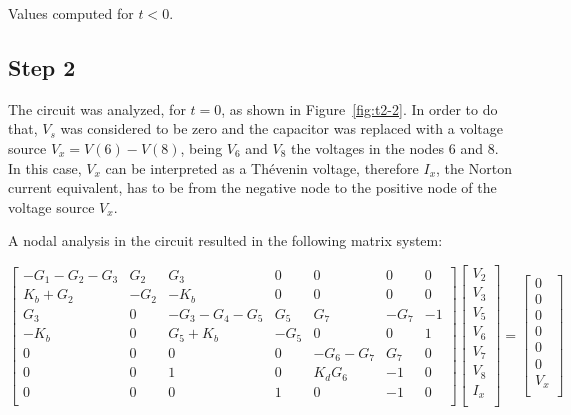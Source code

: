 \begin{table}[ht!]
  \centering
    
  \caption{Values computed for $t<0$.}
  \label{tab:teo1}
\end{table}




\subsection{Step 2}
The circuit was analyzed, for $t=0$, as shown in Figure~\ref{fig:t2-2}. In order to do that, $V_s$ was considered to be zero and the capacitor was replaced with a voltage source $V_x=V(6)-V(8)$, being $V_6$ and $V_8$ the voltages in the nodes 6 and 8. In this case, $V_x$ can be interpreted as a Thévenin voltage, therefore $I_x$, the Norton current equivalent, has to be from the negative node to the positive node of the voltage source $V_x$.


A nodal analysis in the circuit resulted in the following matrix system:

\begin{equation}\label{step2}
  \begin{bmatrix}
    -G_1-G_2-G_3 & G_2 & G_3 & 0 & 0 & 0 & 0 \\
    K_b+G_2 & -G_2 & -K_b & 0 & 0 & 0 & 0 \\
    G_3 & 0 & -G_3-G_4-G_5 & G_5 & G_7 & -G_7 & -1 \\
    -K_b & 0 & G_5+K_b & -G_5 & 0 & 0 & 1 \\
    0 & 0 & 0 & 0 & -G_6-G_7 & G_7 & 0\\
    0 & 0 & 1 & 0 & K_dG_6 & -1 & 0\\
    0 & 0 & 0 & 1 & 0 & -1 & 0\\
  \end{bmatrix}
  \begin{bmatrix}
    V_2\\
    V_3\\
    V_5\\
    V_6\\
    V_7\\
    V_8\\
    I_x\\
  \end{bmatrix}
  =
  \begin{bmatrix}
    0\\
    0\\
    0\\
    0\\
    0\\
    0\\
    V_x\\
  \end{bmatrix}
\end{equation}


